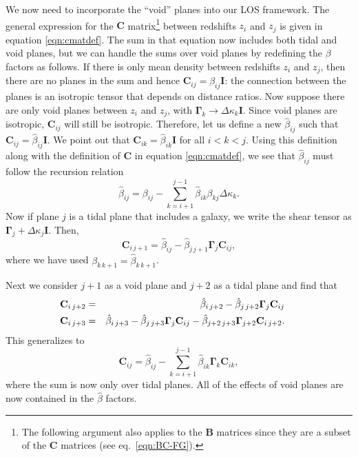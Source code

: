 \documentclass{emulateapj}
\newcommand\B[0]{\mathbf{B}}
\newcommand\C[0]{\mathbf{C}}
\newcommand\I[0]{\mathbf{I}}
\newcommand\GammaMat[0]{\boldsymbol{\Gamma}}
\newcommand\betahat{\hat{\beta}}
\begin{document}
We now need to incorporate the ``void'' planes into our LOS framework.  The general expression for the $\C$ matrix\footnote{The following argument also applies to the $\B$ matrices since they are a subset of the $\C$ matrices (see eq.\ \ref{eqn:BC-FG}).} between redshifts $z_i$ and $z_j$ is given in equation \ref{eqn:cmatdef}. The sum in that equation now includes both tidal and void planes, but we can handle the sums over void planes by redefining the $\beta$ factors as follows.  If there is only mean density between redshifts $z_i$ and $z_j$, then there are no planes in the sum and hence $\C_{i j} = \beta_{i j } \I$: the connection between the planes is an isotropic tensor that depends on distance ratios. Now suppose there are only void planes between $z_i$ and $z_j$, with $\GammaMat_k \rightarrow \Delta \kappa_k \I$. Since void planes are isotropic, $\C_{i j}$ will still be isotropic. Therefore, let us define a new $\betahat_{i j}$ such that $\C_{i j} = \betahat_{i j} \I$. We point out that $\C_{i k } = \betahat_{i k} \I$ for all $i < k < j$. Using this definition along with the definition of $\C$ in equation \ref{eqn:cmatdef}, we see that $\betahat_{i j}$ must follow the recursion relation
\begin{equation}
\label{eqn:betahatdef}
\betahat_{i j}  = \beta_{i j} - \sum \limits_{k = i +1}^{j -1} \betahat_{i k} \beta_{k j} \Delta \kappa_k.
\end{equation}
Now if plane $j$ is a tidal plane that includes a galaxy, we write the shear tensor as $\GammaMat_j + \Delta \kappa_j \I$. Then,
\begin{equation}
\C_{i \, j +1} = \betahat_{i j}  - \betahat_{j \, j+1} \GammaMat_j \C_{i j},
\end{equation}
where we have used $\beta_{k \, k+1} = \betahat_{k\, k+1}$.

Next we consider $j +1$ as a void plane and $j + 2$ as a tidal plane and find that
\begin{eqnarray}
\hspace*{-0.45cm}\C_{i \, j+2} &=& \betahat_{i \, j+2} - \betahat_{j \, j + 2} \GammaMat_j \C_{i j}\\
\hspace*{-0.45cm}\C_{i \, j+3} &=& \betahat_{i \, j+3} - \betahat_{j \, j + 3} \GammaMat_j \C_{i j} - \betahat_{j+2 \, j+3} \GammaMat_{j+2} \C_{i \, j+2}.
\end{eqnarray}
This generalizes to 
\begin{equation}
\C_{i j} = \betahat_{i j} - \sum\limits_{k = i +1}^{j - 1} \betahat_{i k} \GammaMat_k \C_{i k},
\end{equation}
where the sum is now only over tidal planes. All of the effects of void planes are now contained in the $\betahat$ factors.
  
\end{document}
